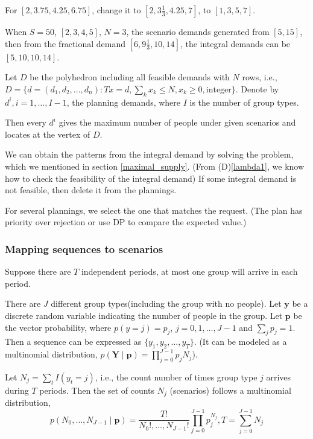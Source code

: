 For $[2, 3.75, 4.25, 6.75]$, change it to $[2, 3\frac{1}{3}, 4.25, 7]$, to $[1, 3, 5, 7]$.

When $S = 50$, $[2,3,4,5]$, $N =3$, the scenario demands generated from $[5,15]$, then from the fractional demand $[6, 9\frac{1}{3}, 10, 14]$, the integral demands can be $[5, 10, 10, 14]$. 

Let $D$ be the polyhedron including all feasible demands with $N$ rows, i.e., $D = \{d = (d_1,d_2,\ldots, d_n): Tx = d,\sum_{k} x_k \leq N, x_k \geq 0, \mbox{integer} \}$.
Denote by $d^{i}, i = 1,\ldots, I-1$, the planning demands, where $I$ is the number of group types.

Then every $d^{i}$ gives the maximum number of people under given scenarios and locates at the vertex of $D$.


We can obtain the patterns from the integral demand by
solving the problem, which we mentioned in section \ref{maximal_supply}. (From (D)\ref{lambda1}, we know how to check the feasibility of the integral demand) If some integral demand is not feasible, then delete it from the plannings.

For several plannings, we select the one that matches the request. (The plan has priority over rejection or use DP to compare the expected value.) 

\subsubsection{Mapping sequences to scenarios}
Suppose there are $T$ independent periods, at most one group will arrive in each period.

There are $J$ different group types(including the group with no people). Let $\mathbf{y}$ be a discrete random variable indicating the number of people in the group. Let $\mathbf{p}$ be the vector probability, where $p(y = j) = p_j$, $j = 0,1,\ldots,J-1$ and $\sum_{j} p_{j} =1$. Then a sequence can be expressed as $\{y_{1}, y_{2}, \ldots, y_{T}\}$. (It can be modeled as a multinomial distribution, $p(\mathbf{Y} \mid \mathbf{p})=\prod_{j=0}^{J-1} p_j N_j$).

Let $N_{j} = \sum_{t} I(y_t = j)$, i.e., the count number of times group type $j$ arrives during $T$ periods. Then the set of counts $N_{j}$ (scenarios) follows a multinomial distribution, $$p\left(N_0, \ldots, N_{J-1} \mid \mathbf{p}\right)=\frac{T !}{N_{0}!, \ldots, N_{J-1}!} \prod_{j=0}^{J-1} p_{j}^{N_j}, T = \sum_{j=0}^{J-1} N_{j}$$

